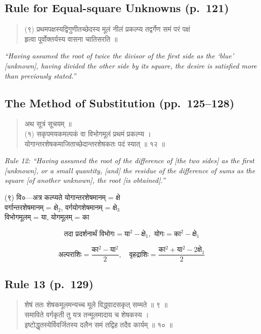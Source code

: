 \documentclass[11pt,a4paper]{article}
\newcommand{\cnote}[1]{\textcolor{notecolor}{\textit{#1}}}
\newcommand{\dev}[1]{{\devanagarifont #1}}
\newenvironment{sanskritverse}{%
  \begin{verse}
}{%
  \end{verse}
}
\begin{document}
\subsection*{Rule for Equal-square Unknowns (p.\ 121)}

\begin{sanskritverse}
\dev{%
(९) प्रथमपक्षस्यद्विगुणीतच्छेदस्य मूलं नीलं प्रकल्प्य तद्वर्गेण समं परं पक्षं\\
हृत्वा पूर्वोक्तर्यस्य वासना चातिसरति ॥}
\end{sanskritverse}

\cnote{``Having assumed the root of twice the divisor of the first side as the `blue' [unknown], having divided the other side by its square, the desire is satisfied more than previously stated.''}

\subsection{The Method of Substitution (pp.\ 125--128)}

\begin{sanskritverse}
\dev{%
अथ सूत्रं सूचयम् ॥\\[0.5em]
(१) सकृपमयकमल्पकं वा विभोगमूलं प्रथमं प्रकल्प्य ।\\
योगान्तरशेषकमाजिताच्छेदान्तरशेषकतः पदं स्यात् ॥ १२ ॥}
\end{sanskritverse}

\cnote{Rule 12: ``Having assumed the root of the difference of [the two sides] as the first [unknown], or a small quantity, [and] the residue of the difference of sums as the square [of another unknown], the root [is obtained].''}

\dev{%
(९) वि०—अत्र कल्प्यते योगान्तरशेषमानम् = क्षे\\
वर्गान्तरशेषमानम् = क्षे$_2$, वर्गयोगशेषमानम् = क्षे$_3$\\
विभोगमूलम् = या, योगमूलम् = का}

$$\text{तदा प्रदर्शनार्थं विभोगः} = \text{या}^2 - \text{क्षे}_1, \text{ योगः} = \text{का}^2 - \text{क्षे}_1$$

$$\text{अल्पराशिः} = \frac{\text{का}^2 - \text{या}^2}{2}, \quad \text{वृहद्राशिः} = \frac{\text{का}^2 + \text{या}^2 - 2\text{क्षे}_1}{2}$$

\subsection*{Rule 13 (p.\ 129)}

\begin{sanskritverse}
\dev{%
शेषं ततः शेषकमूलमन्यच्च मूले विद्ध्वादसकृत् सम्मते ॥ ९ ॥\\
समाविते वर्गकृती तु यत्र तन्मूलमादाय च शेषकस्य ।\\
इष्टोद्धृतस्येर्विवर्जितस्य दलैन समं तद्विह तदैव कार्यम् ॥ १० ॥}
\end{sanskritverse}
\end{document}
